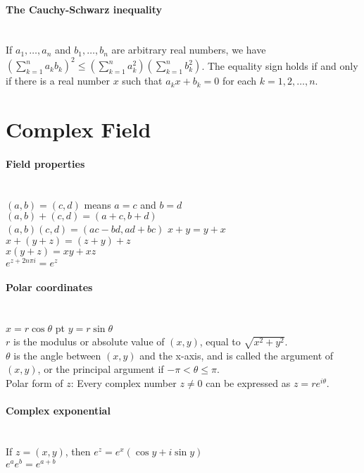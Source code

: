 \documentclass[10pt]{article}
\begin{document}
\paragraph{The Cauchy-Schwarz inequality}\ \\
If $a_1, \ldots, a_n$ and $b_1, \ldots, b_n$ are arbitrary real numbers, we have
$\left( \sum_{k=1}^n a_k b_k \right)^2 \leq \left( \sum_{k=1}^n a_k^2 \right) \left( \sum_{k=1}^n b_k^2 \right)$.
The equality sign holds if and only if there is a real number $x$ such that $a_k x + b_k = 0$
for each $k = 1, 2, \ldots, n$.



\bigskip\bigskip
\section{Complex Field}\smallskip

\paragraph{Field properties}\ \\
$(a,b)=(c,d)$ means $a=c$ and $b=d$\\
$(a,b)+(c,d)=(a+c,b+d)$\\
$(a,b)(c,d)=(ac-bd,ad+bc)$
$x+y=y+x$\\
$x+(y+z)=(z+y)+z$\\
$x(y+z)=xy+xz$\\
$e^{z+2n\pi i}=e^z$

\paragraph{Polar coordinates}\ \\
$x = r \cos \theta$  pt $y = r \sin \theta$\\
$r$ is the modulus or absolute value of $(x,y)$, equal to $\sqrt{x^2+y^2}$.\\
$\theta$ is the angle between $(x,y)$ and the x-axis, and is called the argument of $(x,y)$,
or the principal argument if $-\pi < \theta \leq \pi$.\\
Polar form of $z$: Every complex number $z \neq 0$ can be expressed as $z=re^{i\theta}$.

\paragraph{Complex exponential}\ \\
If $z=(x,y)$, then $e^z = e^x(\cos y + i \sin y)$\\
$e^ae^b=e^{a+b}$
\end{document}
